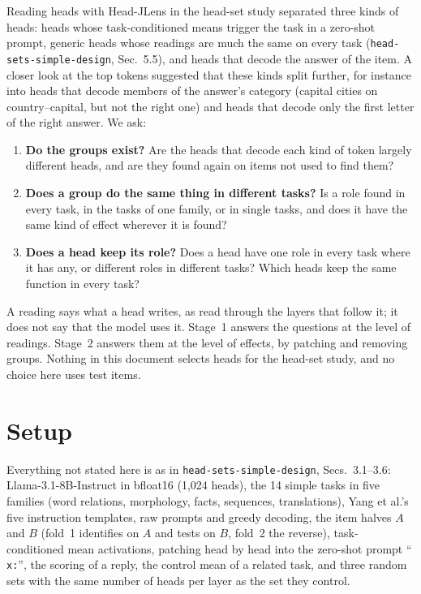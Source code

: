 \documentclass[10pt,a4paper]{article}
\newcommand{\p}[1]{``\texttt{#1}''}
\newcommand{\simpledoc}{\texttt{head-sets-simple-design}}
\begin{document}
Reading heads with Head-JLens in the head-set study separated three kinds of heads: heads whose task-conditioned means trigger the task in a zero-shot prompt, generic heads whose readings are much the same on every task (\simpledoc, Sec.~5.5), and heads that decode the answer of the item. A closer look at the top tokens suggested that these kinds split further, for instance into heads that decode members of the answer's category (capital cities on country--capital, but not the right one) and heads that decode only the first letter of the right answer. We ask:
\begin{enumerate}[label=\textbf{Q\arabic*}]
\item \textbf{Do the groups exist?} Are the heads that decode each kind of token largely different heads, and are they found again on items not used to find them?
\item \textbf{Does a group do the same thing in different tasks?} Is a role found in every task, in the tasks of one family, or in single tasks, and does it have the same kind of effect wherever it is found?
\item \textbf{Does a head keep its role?} Does a head have one role in every task where it has any, or different roles in different tasks? Which heads keep the same function in every task?
\end{enumerate}
A reading says what a head writes, as read through the layers that follow it; it does not say that the model uses it. Stage~1 answers the questions at the level of readings. Stage~2 answers them at the level of effects, by patching and removing groups. Nothing in this document selects heads for the head-set study, and no choice here uses test items.

\section{Setup}\label{sec:setup}

Everything not stated here is as in \simpledoc{}, Secs.~3.1--3.6: Llama-3.1-8B-Instruct in bfloat16 (1{,}024 heads), the 14 simple tasks in five families (word relations, morphology, facts, sequences, translations), Yang et al.'s five instruction templates, raw prompts and greedy decoding, the item halves $A$ and $B$ (fold~1 identifies on $A$ and tests on $B$, fold~2 the reverse), task-conditioned mean activations, patching head by head into the zero-shot prompt \p{ x:}, the scoring of a reply, the control mean of a related task, and three random sets with the same number of heads per layer as the set they control.
\end{document}
